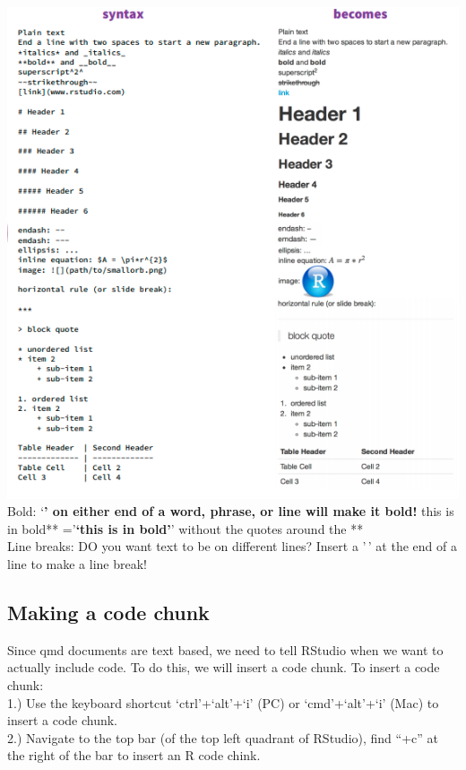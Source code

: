 \documentclass[
  letterpaper,
  DIV=11,
  numbers=noendperiod]{scrartcl}
\begin{document}
\includegraphics{images/RMD_formatting.png} Bold: `\textbf{' on either
end of a word, phrase, or line will make it bold!} this is in bold**
='\textbf{`this is in bold'}' without the quotes around the **\\

Line breaks: DO you want text to be on different lines? Insert a '\,' at
the end of a line to make a line break!

\hypertarget{making-a-code-chunk}{%
\subsection{\texorpdfstring{\textbf{Making a code
chunk}}{Making a code chunk}}\label{making-a-code-chunk}}

Since qmd documents are text based, we need to tell RStudio when we want
to actually include code. To do this, we will insert a code chunk. To
insert a code chunk:\\

1.) Use the keyboard shortcut `ctrl'+`alt'+`i' (PC) or `cmd'+`alt'+`i'
(Mac) to insert a code chunk.\\

2.) Navigate to the top bar (of the top left quadrant of RStudio), find
``+c'' at the right of the bar to insert an R code chink.
\end{document}
